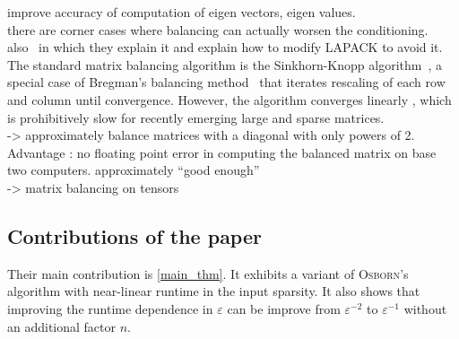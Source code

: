 \cite{chen2000balancing, chen2001preconditioning} improve accuracy of computation of eigen vectors, eigen values.\\

there are corner cases where balancing can actually worsen the conditioning.~\cite{watkins2006case} also~\cite{james2014matrix} in which they explain it and explain how to modify LAPACK to avoid it.\\

The standard matrix balancing algorithm is the Sinkhorn-Knopp algorithm~\cite{sinkhorn1967concerning}, a special case of Bregman’s balancing method~\cite{lamond1981bregman} that iterates rescaling of each row and column until convergence.
However, the algorithm converges linearly \cite{soules1991rate}, which is prohibitively slow for recently emerging large and sparse matrices.\\

\cite{parlett1971balancing} -> approximately balance matrices with a diagonal with only powers of 2. Advantage : no floating point error in computing the balanced matrix on base two computers. approximately ``good enough''\\

\cite{sugiyama2017tensor} -> matrix balancing on tensors 


\subsection{Contributions of the paper}

Their main contribution is \cref{main_thm}. It exhibits a variant of \textsc{Osborn}'s algorithm with near-linear runtime in the input sparsity. It also shows that improving the runtime dependence in \(\varepsilon\) can be improve from \(\varepsilon^{-2}\) to \(\varepsilon^{-1}\) without an additional factor \(n\).  


